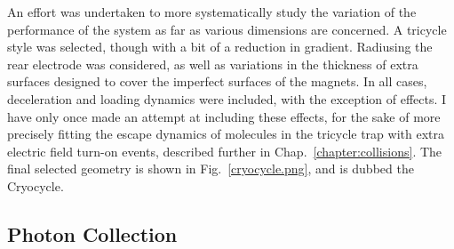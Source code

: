 \documentclass[defaultstyle,11pt]{thesis}
\begin{document}
An effort was undertaken to more systematically study the variation of the performance of the system as far as various dimensions are concerned.
A tricycle style was selected, though with a bit of a reduction in gradient.
Radiusing the rear electrode was considered, as well as variations in the thickness of extra surfaces designed to cover the imperfect surfaces of the magnets.
In all cases, deceleration and loading dynamics were included, with the exception of  effects.
I have only once made an attempt at including these effects, for the sake of more precisely fitting the escape dynamics of molecules in the tricycle trap with extra electric field turn-on events, described further in Chap.~\ref{chapter:collisions}.
The final selected geometry is shown in Fig.~\ref{cryocycle.png}, and is dubbed the Cryocycle.


\subsection{Photon Collection}
\end{document}
